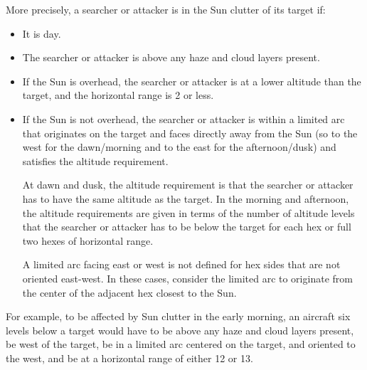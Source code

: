 \begin{advancedrules}
{More precisely, a searcher or attacker is in the Sun clutter of its target if:

\begin{itemize}
\item It is day.
\item The searcher or attacker is above any haze and cloud layers present.
\item If the Sun is overhead, the searcher or attacker is at a lower altitude than the target, and the horizontal range is 2 or less.
\item If the Sun is not overhead, the searcher or attacker is within a limited arc that originates on the target and faces directly away from the Sun (so to the west for the dawn/morning and to the east for the afternoon/dusk) and satisfies the altitude requirement. 

At dawn and dusk, the altitude requirement is that the searcher or attacker has to have the same altitude as the target. In the morning and afternoon, the altitude requirements are given in terms of the number of altitude levels that the searcher or attacker has to be below the target for each hex or full two hexes of horizontal range.

A limited arc facing east or west is not defined for hex sides that are not oriented east-west. In these cases, consider the limited arc to originate from the center of the adjacent hex closest to the Sun.

\end{itemize}

For example, to be affected by Sun clutter in the early morning, an aircraft six levels below a target would have to be above any haze and cloud layers present, be west of the target, be in a limited arc centered on the target, and oriented to the west, and be at a horizontal range of either 12 or 13.

}
\end{advancedrules}
